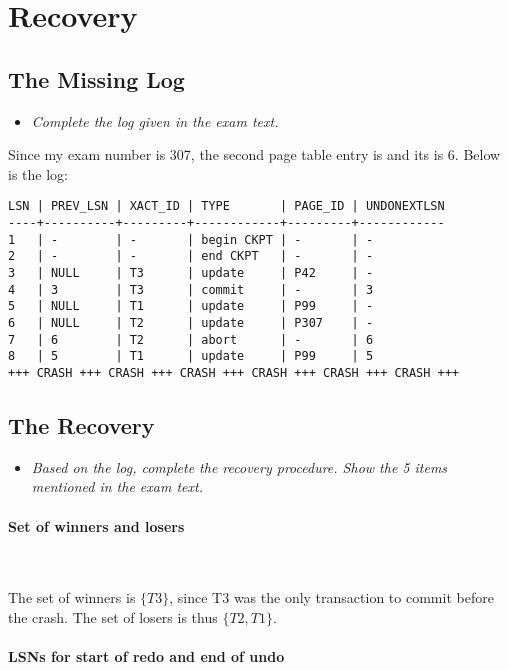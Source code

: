 \newpage
\section{Recovery}

\subsection{The Missing Log}

\begin{itemize}
  \item \textit{Complete the log given in the exam text.}
\end{itemize}

Since my exam number is 307, the second page table entry is  and its
 is 6. Below is the log:

\begin{verbatim}
LSN | PREV_LSN | XACT_ID | TYPE       | PAGE_ID | UNDONEXTLSN
----+----------+---------+------------+---------+------------
1   | -        | -       | begin CKPT | -       | -
2   | -        | -       | end CKPT   | -       | -
3   | NULL     | T3      | update     | P42     | -
4   | 3        | T3      | commit     | -       | 3
5   | NULL     | T1      | update     | P99     | -
6   | NULL     | T2      | update     | P307    | -
7   | 6        | T2      | abort      | -       | 6
8   | 5        | T1      | update     | P99     | 5
+++ CRASH +++ CRASH +++ CRASH +++ CRASH +++ CRASH +++ CRASH +++
\end{verbatim}

\subsection{The Recovery}

\begin{itemize}
  \item \textit{Based on the log, complete the recovery procedure. Show the 5
    items mentioned in the exam text.}
\end{itemize}

\paragraph{Set of winners and losers}~\smallskip

The set of winners is $\{T3\}$, since T3 was the only transaction to commit
before the crash. The set of losers is thus $\{T2, T1\}$.

\paragraph{LSNs for start of redo and end of undo}~\smallskip

